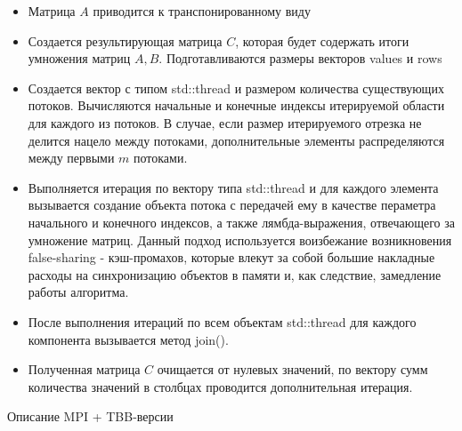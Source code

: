 \documentclass[12pt]{article}
\begin{document}
\begin{itemize}
    \item Матрица $A$ приводится к транспонированному виду
    \item Создается результирующая матрица $C$, которая будет содержать итоги умножения матриц $A, B$. Подготавливаются размеры векторов values и rows 
    \item Создается вектор с типом std::thread и размером количества существующих потоков. Вычисляются начальные и конечные индексы итерируемой области для каждого из потоков. В случае, если размер итерируемого отрезка не делится нацело между потоками, дополнительные элементы распределяются между первыми $m$ потоками. 
    \item Выполняется итерация по вектору типа std::thread и для каждого элемента вызывается создание объекта потока с передачей ему в качестве пераметра начального и конечного индексов, а также лямбда-выражения, отвечающего за умножение матриц. Данный подход используется воизбежание возникновения false-sharing - кэш-промахов, которые влекут за собой большие накладные расходы на синхронизацию объектов в памяти и, как следствие, замедление работы алгоритма. 
    \item После выполнения итераций по всем объектам std::thread для каждого компонента вызывается метод join().
    \item Полученная матрица $C$ очищается от нулевых значений, по вектору сумм количества значений в столбцах проводится дополнительная итерация.
\end{itemize}
\newpage
\begin{center}
\Large{Описание MPI + TBB-версии}
\end{center}
\end{document}
